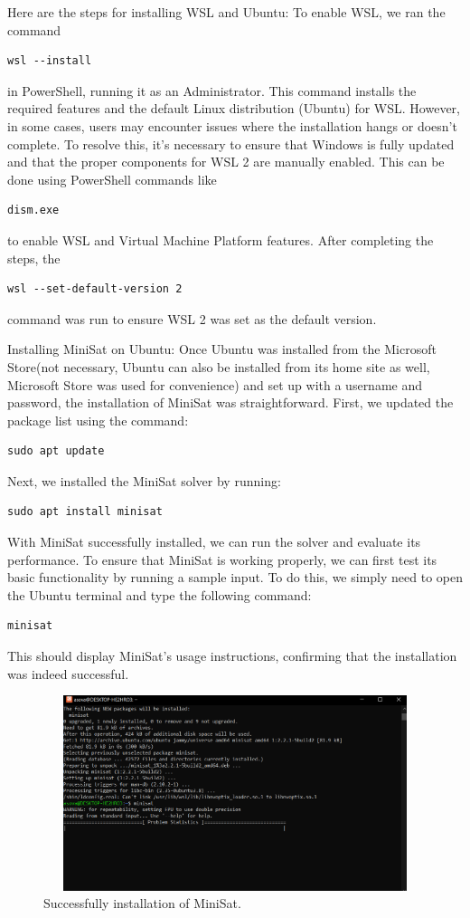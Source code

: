 \documentclass[runningheads]{llncs}
\begin{document}
Here are the steps for installing \ac{WSL} and Ubuntu: To enable \ac{WSL}, we ran the command \begin{verbatim}wsl --install\end{verbatim} in PowerShell, running it as an Administrator. This command installs the required features and the default Linux distribution (Ubuntu) for \ac{WSL}. However, in some cases, users may encounter issues where the installation hangs or doesn't complete. To resolve this, it's necessary to ensure that Windows is fully updated and that the proper components for \ac{WSL} 2 are manually enabled. This can be done using PowerShell commands like \begin{verbatim}dism.exe\end{verbatim} to enable \ac{WSL} and Virtual Machine Platform features. After completing the steps, the \begin{verbatim}wsl --set-default-version 2 \end{verbatim}  command was run to ensure \ac{WSL} 2 was set as the default version.

Installing MiniSat on Ubuntu: Once Ubuntu was installed from the Microsoft Store(not necessary, Ubuntu can also be installed from its home site as well, Microsoft Store was used for convenience) and set up with a username and password, the installation of MiniSat was straightforward. First, we updated the package list using the command: \begin{verbatim}sudo apt update\end{verbatim} Next, we installed the MiniSat solver by running: \begin{verbatim}sudo apt install minisat\end{verbatim}

With MiniSat successfully installed, we can run the solver and evaluate its performance. To ensure that MiniSat is working properly, we can first test its basic functionality by running a sample input. To do this, we simply need to open the Ubuntu terminal and type the following command: \begin{verbatim}minisat\end{verbatim} This should display MiniSat’s usage instructions, confirming that the installation was indeed successful.

\begin{figure}
\centering
\includegraphics[width=12cm, height=5.7cm]{fig.1.png}
\caption{Successfully installation of MiniSat.} 
\label{fig1}
\end{figure}
\end{document}
